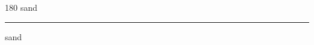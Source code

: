 
\begin{frame}
\begin{center}
\begin{turn}{180}
{\fontsize{2.5cm}{1em}\selectfont sand}
\end{turn}
\vspace{1em}\par  
\hrule
\vspace{1em}\par  
{\fontsize{2.5cm}{1em}\selectfont sand}
\end{center}
\end{frame}
